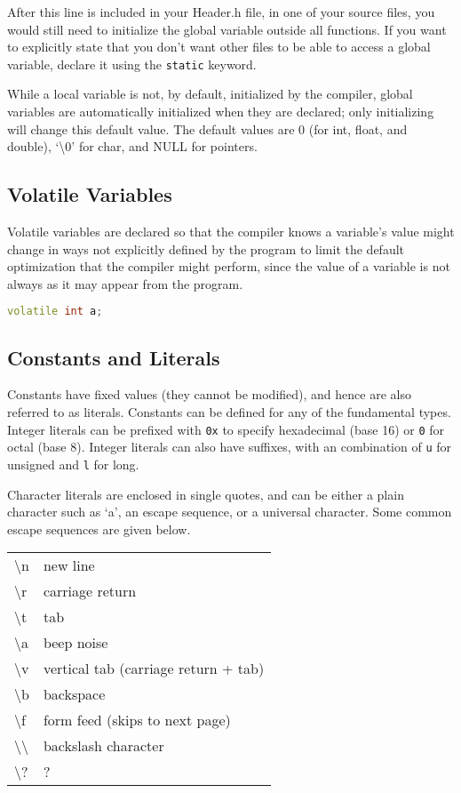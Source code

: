 \documentclass[10pt]{article}
\begin{document}
After this line is included in your Header.h file, in one of your source files, you would still need to initialize the global variable outside all functions. If you want to explicitly state that you don't want other files to be able to access a global variable, declare it using the \texttt{static} keyword.

While a local variable is not, by default, initialized by the compiler, global variables are automatically initialized when they are declared; only initializing will change this default value. The default values are 0 (for int, float, and double), `\textbackslash 0' for char, and NULL for pointers.

\subsection{Volatile Variables}

Volatile variables are declared so that the compiler knows a variable's value might change in ways not explicitly defined by the program to limit the default optimization that the compiler might perform, since the value of a variable is not always as it may appear from the program.

\begin{lstlisting}[language=C++]
volatile int a;
\end{lstlisting}

\subsection{Constants and Literals}

Constants have fixed values (they cannot be modified), and hence are also referred to as literals. Constants can be defined for any of the fundamental types. Integer literals can be prefixed with \texttt{0x} to specify hexadecimal (base 16) or \texttt{0} for octal (base 8). Integer literals can also have suffixes, with an combination of \texttt{u} for unsigned and \texttt{l} for long.

Character literals are enclosed in single quotes, and can be either a plain character such as `a', an escape sequence, or a universal character. Some common escape sequences are given below.

\begin{center}
\begin{tabular}{l l}
\textbackslash n & new line\\
\textbackslash r & carriage return\\
\textbackslash t & tab\\
\textbackslash a & beep noise\\
\textbackslash v & vertical tab (carriage return + tab)\\
\textbackslash b & backspace\\
\textbackslash f & form feed (skips to next page)\\
\textbackslash\textbackslash & backslash character\\
\textbackslash? & ?\\
\end{tabular}
\end{center}
\end{document}

